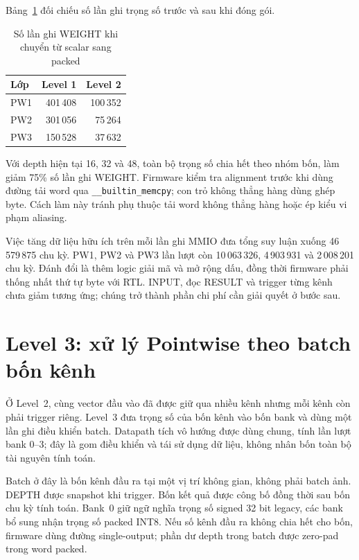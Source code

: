 Bảng~\ref{tab:packed-traffic} đối chiếu số lần ghi trọng số trước và sau khi đóng gói.

\begin{table}[!ht]
\renewcommand{\arraystretch}{1.12}
\centering
\caption{Số lần ghi WEIGHT khi chuyển từ scalar sang packed}
\label{tab:packed-traffic}
\begin{tabular}{lrr}
\hline
Lớp & Level 1 & Level 2 \\
\hline
PW1 & 401\,408 & 100\,352 \\
PW2 & 301\,056 & 75\,264 \\
PW3 & 150\,528 & 37\,632 \\
\hline
\end{tabular}
\end{table}
Với depth hiện tại 16, 32 và 48, toàn bộ trọng số chia hết theo nhóm bốn, làm giảm 75\% số lần ghi WEIGHT. Firmware kiểm tra alignment trước khi dùng đường tải word qua \texttt{\_\_builtin\_memcpy}; con trỏ không thẳng hàng dùng ghép byte. Cách làm này tránh phụ thuộc tải word không thẳng hàng hoặc ép kiểu vi phạm aliasing.

Việc tăng dữ liệu hữu ích trên mỗi lần ghi MMIO đưa tổng suy luận xuống 46\,579\,875 chu kỳ. PW1, PW2 và PW3 lần lượt còn 10\,063\,326, 4\,903\,931 và 2\,008\,201 chu kỳ. Đánh đổi là thêm logic giải mã và mở rộng dấu, đồng thời firmware phải thống nhất thứ tự byte với RTL. INPUT, đọc RESULT và trigger từng kênh chưa giảm tương ứng; chúng trở thành phần chi phí cần giải quyết ở bước sau.

\section{Level 3: xử lý Pointwise theo batch bốn kênh}
Ở Level~2, cùng vector đầu vào đã được giữ qua nhiều kênh nhưng mỗi kênh còn phải trigger riêng. Level~3 đưa trọng số của bốn kênh vào bốn bank và dùng một lần ghi điều khiển batch. Datapath tích vô hướng được dùng chung, tính lần lượt bank 0--3; đây là gom điều khiển và tái sử dụng dữ liệu, không nhân bốn toàn bộ tài nguyên tính toán.

Batch ở đây là bốn kênh đầu ra tại một vị trí không gian, không phải batch ảnh. DEPTH được snapshot khi trigger. Bốn kết quả được công bố đồng thời sau bốn chu kỳ tính toán. Bank~0 giữ ngữ nghĩa trọng số signed 32 bit legacy, các bank bổ sung nhận trọng số packed INT8. Nếu số kênh đầu ra không chia hết cho bốn, firmware dùng đường single-output; phần dư depth trong batch được zero-pad trong word packed.

